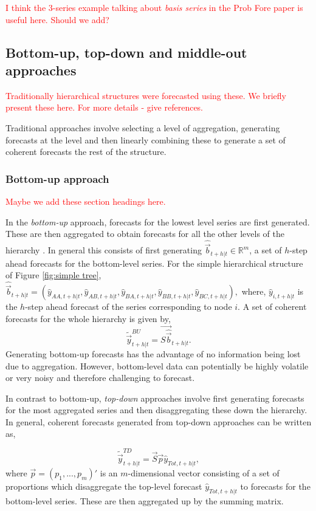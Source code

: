 \documentclass[graybox]{svmult}
\begin{document}
\textcolor{red}{I think the 3-series example talking about \textit{basis series} in the Prob Fore paper is useful here. Should we add?}


\subsection{Bottom-up, top-down and middle-out approaches}
\textcolor{red}{Traditionally hierarchical structures were forecasted using these. We briefly present these here. For more details - give references.}

Traditional approaches involve selecting a level of aggregation, generating forecasts at the level and then linearly combining these to generate a set of coherent forecasts the rest of the structure.

\subsubsection{Bottom-up approach}
\textcolor{red}{Maybe we add these section headings here.}

In the \textit{bottom-up} approach, forecasts for the lowest level series are first generated. These are then aggregated to obtain forecasts for all the other levels of the hierarchy \citep{dunn1976}. In general this consists of first generating $\hat{\vec{b}}_{t+h|t} \in \mathbb{R}^m$, a set of $h$-step ahead forecasts for the bottom-level series. For the simple hierarchical structure of Figure \ref{fig:simple tree}, $\hat{\vec{b}}_{t+h|t} = (\hat{{y}}_{AA,t+h|t}, \hat{{y}}_{AB,t+h|t}, \hat{{y}}_{BA,t+h|t}, \hat{{y}}_{BB,t+h|t},\hat{{y}}_{BC,t+h|t}),$ where, $\hat{{y}}_{i,t+h|t}$ is the $h$-step ahead forecast of the series corresponding to node $i$. A set of coherent forecasts for the whole hierarchy is given by,
\begin{equation*}\label{eq:BU}
\tilde{\vec{y}}^{BU}_{t+h|t}=\vec{S\hat{\vec{b}}}_{t+h|t}.
\end{equation*}
Generating bottom-up forecasts has the advantage of no information being lost due to aggregation. However, bottom-level data can potentially be highly volatile or very noisy and therefore challenging to forecast.

In contrast to bottom-up, \textit{top-down} approaches involve first generating forecasts for the most aggregated series and then disaggregating these down the hierarchy. In general, coherent forecasts generated from top-down approaches can be written as,

\begin{equation*}
\tilde{\vec{y}}^{TD}_{t+h|t}=\vec{S}\vec{p}\hat{y}_{Tot, t+h|t},
\end{equation*}
where $\vec{p} = (p_1,...,p_m)'$ is an $m$-dimensional vector consisting of a set of proportions which disaggregate the top-level forecast $\hat{y}_{Tot, t+h|t}$ to forecasts for the bottom-level series. These are then aggregated up by the summing matrix.
\end{document}
